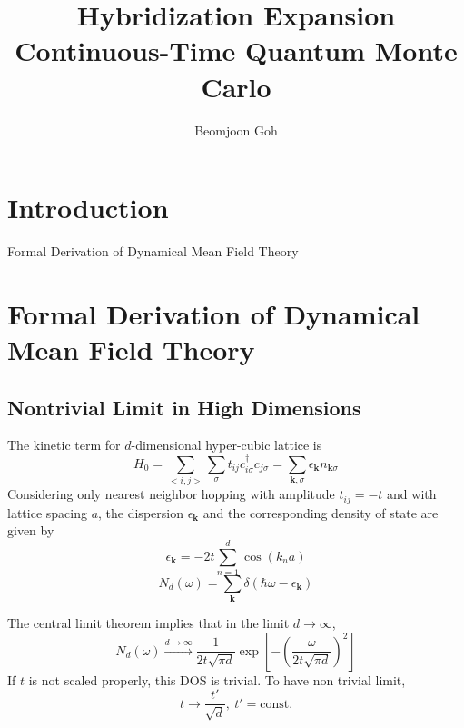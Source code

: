\documentclass[a4paper]{article}
\title{Hybridization Expansion Continuous-Time Quantum Monte Carlo}
\author{Beomjoon Goh}
\begin{document}
\maketitle

\section{Introduction} %
\label{sec:Introduction}
Formal Derivation of Dynamical Mean Field Theory

\section{Formal Derivation of Dynamical Mean Field Theory} %
\label{sec:Formal Derivation of Dynamical Mean Field Theory}

\subsection{Nontrivial Limit in High Dimensions} %
\label{sub:Nontrivial Limit in High Dimensions}
The kinetic term for $d$-dimensional hyper-cubic lattice is 
\begin{equation}
    H_0 = \sum_{<i,j>}\sum_{\sigma} t_{ij} c^{\dagger}_{i\sigma}c_{j\sigma}
        = \sum_{\mathbf{k},\sigma} \epsilon_{\mathbf{k}} n_{\mathbf{k}\sigma}
\end{equation}
Considering only nearest neighbor hopping with amplitude $t_{ij} = -t$ and with
lattice spacing $a$, the dispersion $\epsilon_{\mathbf{k}}$ and the
corresponding density of state are given by
\begin{equation}
    \epsilon_{\mathbf{k}} = -2t \sum_{n=1}^{d} \cos(k_n a)
\end{equation}
\begin{equation}
    N_d(\omega) = \sum_{\mathbf{k}} \delta(\hbar\omega - \epsilon_{\mathbf{k}})
\end{equation}

The central limit theorem implies that in the limit $d \to \infty$,
\begin{equation}
    N_d(\omega) \xrightarrow{d \to \infty} 
        \frac{1}{2t\sqrt{\pi d}}
        \exp \left[ -\left( \frac{\omega}{2t\sqrt{\pi d}} \right)^2 \right]
\end{equation}
If $t$ is not scaled properly, this DOS is trivial. To have non trivial limit,
\begin{equation}
    t \to \frac{t'}{\sqrt{d}},\ t' = \text{const.}
\end{equation}
\end{document}
